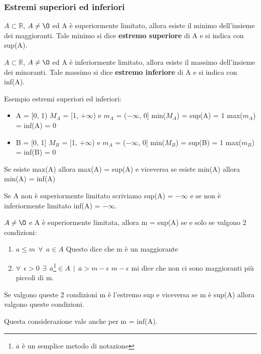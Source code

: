 \subsubsection{Estremi superiori ed inferiori}
\begin{theorem}
    $A \subset \mathbb{R}$, $A \neq \O$ ed A è superiormente limitato, allora esiste il minimo dell'insieme dei maggioranti. Tale minimo si dice \textbf{estremo superiore} di A e si indica con sup(A).
\end{theorem}
\begin{theorem}
    $A \subset \mathbb{R}$, $A \neq \O$ ed A è inferiormente limitato, allora esiste il massimo dell'insieme dei minoranti. Tale massimo si dice \textbf{estremo inferiore} di A e si indica con inf(A).
\end{theorem}
\begin{example}
    Esempio estremi superiori ed inferiori:
    \begin{itemize}
        \item A = [0, 1) \hspace{.1cm} $M_A$ = [1, $+\infty$) e $m_A$ = ($-\infty$, 0] \hspace{.1cm} min($M_A$) = sup(A) = 1 \hspace{.2cm} max($m_A$) = inf(A) = 0
        \item B = [0, 1] \hspace{.1cm} $M_B$ = [1, $+\infty$) e $m_A$ = ($-\infty$, 0] \hspace{.1cm} min($M_B$) = sup(B) = 1 \hspace{.2cm} max($m_B$) = inf(B) = 0
    \end{itemize}
    \begin{observation}
        Se esiste max(A) allora max(A) = sup(A) e viceversa se esiste min(A) allora min(A) = inf(A)
    \end{observation}
\end{example}
\begin{note}
    Se A non è superiormente limitato scriviamo sup(A) = $-\infty$ e se non è inferiormente limitato inf(A) = $-\infty$.
\end{note}
\begin{observation}
    $A \neq \O$ e A è superiormente limitata, allora m = sup(A) se e solo se valgono 2 condizioni:
    \begin{enumerate}
        \item $a \leq m \: \: \forall \: \: a \in A$ \hspace{.3cm} Questo dice che m è un maggiorante
        \item $\forall \: \: \epsilon > 0 \: \: \exists \: \: \overline{a}$\footnote{$\overline{a}$ è un semplice metodo di notazione}$\in A \: \: | \: \: \overline{a} > m - \epsilon$ \hspace{.3cm} $m - \epsilon$ mi dice che non ci sono maggioranti più piccoli di m. 
    \end{enumerate}
    Se valgono queste 2 condizioni m è l'estremo sup e viceversa se m è sup(A) allora valgono queste condizioni.
    \begin{note}
        Questa considerazione vale anche per m = inf(A).
    \end{note}
\end{observation}

